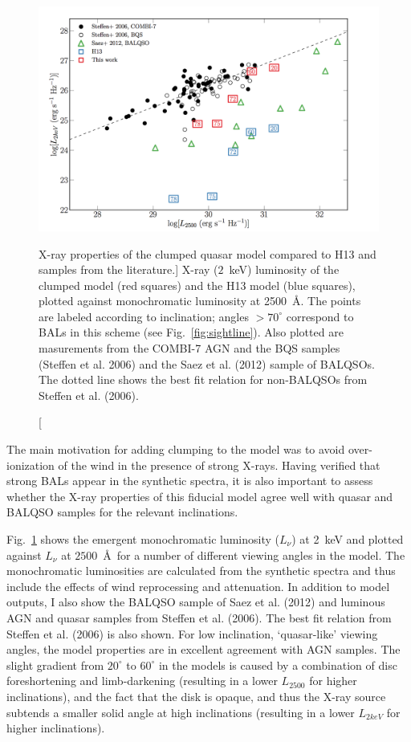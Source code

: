 \begin{figure}
\centering
\includegraphics[width=1.0\textwidth]{figures/06-agnpaper/fig6.png}
\caption
[X-ray properties of the clumped quasar model compared to H13 and samples
from the literature.]
{
X-ray ($2$~keV) luminosity of the clumped model (red squares) 
and the H13 model (blue squares), plotted against monochromatic luminosity 
at 2500~\AA. The points are labeled according to inclination; angles
$>70^\circ$ correspond to BALs in this scheme (see Fig.~\ref{fig:sightline}).
Also plotted are masurements from 
the COMBI-7 AGN and the BQS samples (Steffen et al. 2006) and the Saez et al. (2012) 
sample of BALQSOs. The dotted line shows the best fit relation for non-BALQSOs 
from Steffen et al. (2006).
}
\label{fig:xray}
\end{figure}

The main motivation for adding clumping to the model was
to avoid over-ionization of the wind in the presence of strong X-rays. 
Having verified that strong BALs appear in the synthetic spectra,
it is also important to assess whether the X-ray properties of this
fiducial model agree well with quasar and BALQSO samples for the relevant
inclinations.

Fig.~\ref{fig:xray} shows the emergent
monochromatic luminosity ($L_\nu$) at 2~keV and 
plotted against $L_\nu$ at $2500$~\AA\ 
for a number of different viewing angles in the model.
The monochromatic luminosities are calculated from the synthetic spectra and thus include
the effects of wind reprocessing and attenuation. In addition to model outputs,
I also show the BALQSO sample of Saez et al. (2012) and luminous AGN and quasar
samples from Steffen et al. (2006). The best fit relation from Steffen et al. (2006) 
is also shown. For low inclination, `quasar-like' viewing angles,\index{quasar}
the model properties are in excellent agreement with AGN samples. The slight gradient from $20^\circ$ to
$60^\circ$ in the models is caused by a combination of disc foreshortening and limb-darkening 
(resulting in a lower $L_{2500}$ for higher inclinations), and the fact that the disk 
is opaque, and thus the X-ray source subtends a smaller solid angle at high inclinations
(resulting in a lower $L_{2keV}$ for higher inclinations). 


